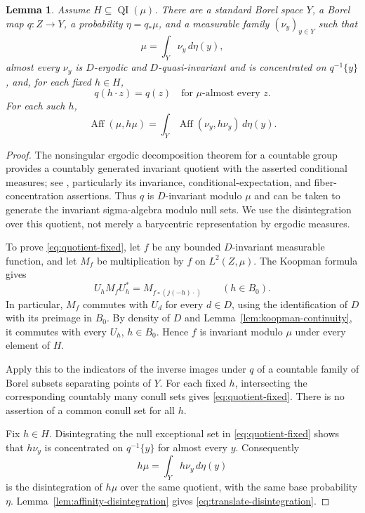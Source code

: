 \documentclass[11pt]{article}
\newtheorem{lemma}[theorem]{Lemma}
\theoremstyle{definition}
\newcommand{\Aff}{\operatorname{Aff}}
\newcommand{\QI}{\operatorname{QI}}
\begin{document}
\begin{lemma}\label{lem:fixed-quotient}
Assume $H\subseteq\QI(\mu)$. There are a standard Borel space $Y$, a
Borel map $q:Z\to Y$, a probability $\eta=q_*\mu$, and a measurable
family $(\nu_y)_{y\in Y}$ such that
\[
 \mu=\int_Y\nu_y\,d\eta(y),
\]
almost every $\nu_y$ is $D$-ergodic and $D$-quasi-invariant and is
concentrated on $q^{-1}\{y\}$, and, for each fixed $h\in H$,
\begin{equation}\label{eq:quotient-fixed}
 q(h\cdot z)=q(z)\quad\text{for }\mu\text{-almost every }z.
\end{equation}
For each such $h$,
\begin{equation}\label{eq:translate-disintegration}
 \Aff(\mu,h\mu)
   =\int_Y\Aff(\nu_y,h\nu_y)\,d\eta(y).
\end{equation}
\end{lemma}

\begin{proof}
The nonsingular ergodic decomposition theorem for a countable group
provides a countably generated invariant quotient with the asserted
conditional measures; see \cite[Theorem~1.5]{GS}, particularly its
invariance, conditional-expectation, and fiber-concentration assertions.
Thus $q$ is $D$-invariant modulo $\mu$ and can be taken to generate
the invariant sigma-algebra modulo null sets. We use the disintegration
over this quotient, not merely a barycentric representation by ergodic
measures.

To prove \eqref{eq:quotient-fixed}, let $f$ be any bounded
$D$-invariant measurable function,
and let $M_f$ be multiplication by $f$ on $L^2(Z,\mu)$. The Koopman
formula gives
\[
 U_hM_fU_h^*=M_{f\circ(j(-h)\cdot)}\qquad(h\in B_0).
\]
In particular, $M_f$ commutes with $U_d$ for every $d\in D$, using
the identification of $D$ with its preimage in $B_0$. By density of
$D$ and Lemma~\ref{lem:koopman-continuity}, it commutes with every
$U_h$, $h\in B_0$. Hence $f$ is invariant modulo $\mu$ under every
element of $H$.

Apply this to the indicators of the inverse images under $q$ of a
countable family of Borel subsets separating points of $Y$. For each
fixed $h$, intersecting the corresponding countably many conull sets
gives \eqref{eq:quotient-fixed}. There is no assertion of a common
conull set for all $h$.

Fix $h\in H$. Disintegrating the null exceptional set in
\eqref{eq:quotient-fixed} shows
that $h\nu_y$ is concentrated on $q^{-1}\{y\}$ for almost every $y$.
Consequently
\[
 h\mu=\int_Y h\nu_y\,d\eta(y)
\]
is the disintegration of $h\mu$ over the same quotient, with the same
base probability $\eta$. Lemma~\ref{lem:affinity-disintegration} gives
\eqref{eq:translate-disintegration}.
\end{proof}
\end{document}
